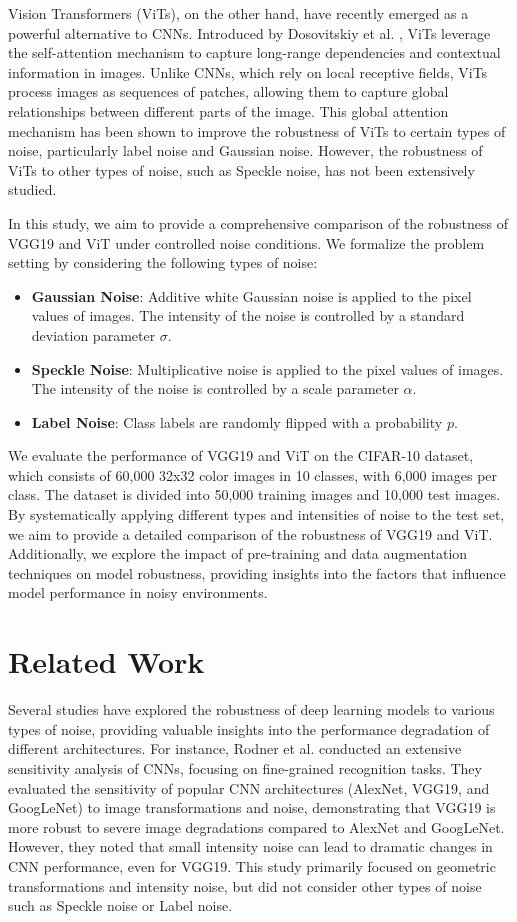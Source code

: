 \documentclass{article}
\begin{document}
Vision Transformers (ViTs), on the other hand, have recently emerged as a powerful alternative to CNNs. Introduced by Dosovitskiy et al. \cite{dosovitskiy2020image}, ViTs leverage the self-attention mechanism to capture long-range dependencies and contextual information in images. Unlike CNNs, which rely on local receptive fields, ViTs process images as sequences of patches, allowing them to capture global relationships between different parts of the image. This global attention mechanism has been shown to improve the robustness of ViTs to certain types of noise, particularly label noise and Gaussian noise. However, the robustness of ViTs to other types of noise, such as Speckle noise, has not been extensively studied.

In this study, we aim to provide a comprehensive comparison of the robustness of VGG19 and ViT under controlled noise conditions. We formalize the problem setting by considering the following types of noise:
\begin{itemize}
    \item \textbf{Gaussian Noise}: Additive white Gaussian noise is applied to the pixel values of images. The intensity of the noise is controlled by a standard deviation parameter $\sigma$.
    \item \textbf{Speckle Noise}: Multiplicative noise is applied to the pixel values of images. The intensity of the noise is controlled by a scale parameter $\alpha$.
    \item \textbf{Label Noise}: Class labels are randomly flipped with a probability $p$.
\end{itemize}

We evaluate the performance of VGG19 and ViT on the CIFAR-10 dataset, which consists of 60,000 32x32 color images in 10 classes, with 6,000 images per class. The dataset is divided into 50,000 training images and 10,000 test images. By systematically applying different types and intensities of noise to the test set, we aim to provide a detailed comparison of the robustness of VGG19 and ViT. Additionally, we explore the impact of pre-training and data augmentation techniques on model robustness, providing insights into the factors that influence model performance in noisy environments.

\section{Related Work}
Several studies have explored the robustness of deep learning models to various types of noise, providing valuable insights into the performance degradation of different architectures. For instance, Rodner et al. \cite{rodner2016sensitivity} conducted an extensive sensitivity analysis of CNNs, focusing on fine-grained recognition tasks. They evaluated the sensitivity of popular CNN architectures (AlexNet, VGG19, and GoogLeNet) to image transformations and noise, demonstrating that VGG19 is more robust to severe image degradations compared to AlexNet and GoogLeNet. However, they noted that small intensity noise can lead to dramatic changes in CNN performance, even for VGG19. This study primarily focused on geometric transformations and intensity noise, but did not consider other types of noise such as Speckle noise or Label noise.
\end{document}
